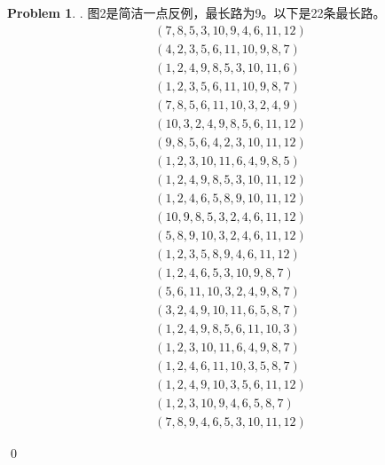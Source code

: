 \documentclass[UTF8]{ctexart}
\newenvironment{sol}
  {\par\vspace{3mm}\noindent{\it Solution}.}
  {\qed \\ \medskip}
\theoremstyle{definition}
\newtheorem{problem}{Problem}
\begin{document}
\begin{problem}
\begin{sol}
图2是简洁一点反例，最长路为9。以下是22条最长路。
\begin{align*}
  (7, 8, 5, 3, 10, 9, 4, 6, 11, 12)\\
  (4, 2, 3, 5, 6, 11, 10, 9, 8, 7)\\
  (1, 2, 4, 9, 8, 5, 3, 10, 11, 6)\\
  (1, 2, 3, 5, 6, 11, 10, 9, 8, 7)\\
  (7, 8, 5, 6, 11, 10, 3, 2, 4, 9)\\
  (10, 3, 2, 4, 9, 8, 5, 6, 11, 12)\\
  (9, 8, 5, 6, 4, 2, 3, 10, 11, 12)\\
  (1, 2, 3, 10, 11, 6, 4, 9, 8, 5)\\
  (1, 2, 4, 9, 8, 5, 3, 10, 11, 12)\\
  (1, 2, 4, 6, 5, 8, 9, 10, 11, 12)\\
  (10, 9, 8, 5, 3, 2, 4, 6, 11, 12)\\
  (5, 8, 9, 10, 3, 2, 4, 6, 11, 12)\\
  (1, 2, 3, 5, 8, 9, 4, 6, 11, 12)\\
  (1, 2, 4, 6, 5, 3, 10, 9, 8, 7)\\
  (5, 6, 11, 10, 3, 2, 4, 9, 8, 7)\\
  (3, 2, 4, 9, 10, 11, 6, 5, 8, 7)\\
  (1, 2, 4, 9, 8, 5, 6, 11, 10, 3)\\
  (1, 2, 3, 10, 11, 6, 4, 9, 8, 7)\\
  (1, 2, 4, 6, 11, 10, 3, 5, 8, 7)\\
  (1, 2, 4, 9, 10, 3, 5, 6, 11, 12)\\
  (1, 2, 3, 10, 9, 4, 6, 5, 8, 7)\\
  (7, 8, 9, 4, 6, 5, 3, 10, 11, 12)
\end{align*}


\end{sol}
\end{problem}
\end{document}
